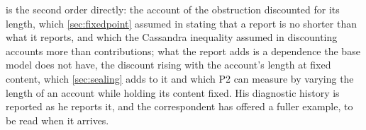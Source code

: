 is the second order directly: the account of the obstruction discounted for its length, which \autoref{sec:fixedpoint} assumed in stating that a report is no shorter than what it reports, and which the Cassandra inequality assumed in discounting accounts more than contributions; what the report adds is a dependence the base model does not have, the discount rising with the account's length at fixed content, which \autoref{sec:sealing} adds to it and which P2 can measure by varying the length of an account while holding its content fixed. His diagnostic history is reported as he reports it, and the correspondent has offered a fuller example, to be read when it arrives.
